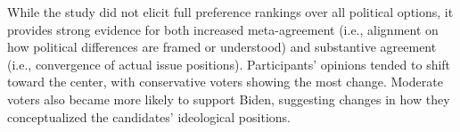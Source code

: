 While the study did not elicit full preference rankings over all political
options, it provides strong evidence for both increased meta-agreement (i.e.,
alignment on how political differences are framed or understood) and
substantive agreement (i.e., convergence of actual issue positions).
Participants’ opinions tended to shift toward the center, with conservative
voters showing the most change. Moderate voters also became more likely to
support Biden, suggesting changes in how they conceptualized the candidates’
ideological positions.
